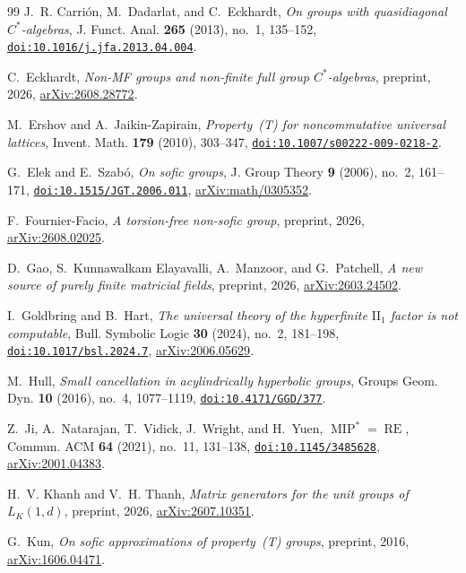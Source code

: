 \documentclass[11pt]{amsart}
\newcommand{\doi}[1]{\href{https://doi.org/#1}{\nolinkurl{doi:#1}}}
\theoremstyle{plain}
\begin{document}
\begin{thebibliography}{99}
J.~R. Carri\'on, M.~Dadarlat, and C.~Eckhardt,
\emph{On groups with quasidiagonal $C^*$-algebras},
J. Funct. Anal. \textbf{265} (2013), no.~1, 135--152,
\doi{10.1016/j.jfa.2013.04.004}.

C.~Eckhardt,
\emph{Non-MF groups and non-finite full group $C^*$-algebras},
preprint, 2026,
\href{https://arxiv.org/abs/2608.28772}{arXiv:2608.28772}.

M.~Ershov and A.~Jaikin-Zapirain,
\emph{Property~\textup{(T)} for noncommutative universal lattices},
Invent. Math. \textbf{179} (2010), 303--347,
\doi{10.1007/s00222-009-0218-2}.

G.~Elek and E.~Szab\'o,
\emph{On sofic groups},
J. Group Theory \textbf{9} (2006), no.~2, 161--171,
\doi{10.1515/JGT.2006.011},
\href{https://arxiv.org/abs/math/0305352}{arXiv:math/0305352}.

F.~Fournier-Facio,
\emph{A torsion-free non-sofic group},
preprint, 2026,
\href{https://arxiv.org/abs/2608.02025}{arXiv:2608.02025}.

D.~Gao, S.~Kunnawalkam Elayavalli, A.~Manzoor, and G.~Patchell,
\emph{A new source of purely finite matricial fields},
preprint, 2026,
\href{https://arxiv.org/abs/2603.24502}{arXiv:2603.24502}.

I.~Goldbring and B.~Hart,
\emph{The universal theory of the hyperfinite $\mathrm{II}_1$ factor is not
computable},
Bull. Symbolic Logic \textbf{30} (2024), no.~2, 181--198,
\doi{10.1017/bsl.2024.7},
\href{https://arxiv.org/abs/2006.05629}{arXiv:2006.05629}.

M.~Hull,
\emph{Small cancellation in acylindrically hyperbolic groups},
Groups Geom. Dyn. \textbf{10} (2016), no.~4, 1077--1119,
\doi{10.4171/GGD/377}.

Z.~Ji, A.~Natarajan, T.~Vidick, J.~Wright, and H.~Yuen,
\emph{$\operatorname{MIP}^*=\operatorname{RE}$},
Commun. ACM \textbf{64} (2021), no.~11, 131--138,
\doi{10.1145/3485628},
\href{https://arxiv.org/abs/2001.04383}{arXiv:2001.04383}.

H.~V. Khanh and V.~H. Thanh,
\emph{Matrix generators for the unit groups of $L_K(1,d)$},
preprint, 2026,
\href{https://arxiv.org/abs/2607.10351}{arXiv:2607.10351}.

G.~Kun,
\emph{On sofic approximations of property~\textup{(T)} groups},
preprint, 2016,
\href{https://arxiv.org/abs/1606.04471}{arXiv:1606.04471}.


\end{thebibliography}
\end{document}
